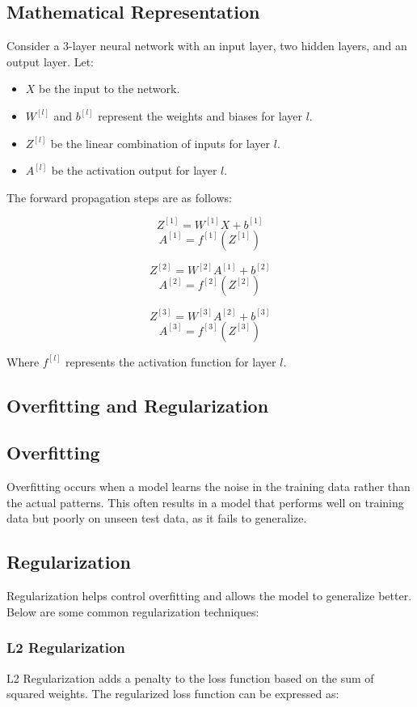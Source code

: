\documentclass{article}
\begin{document}
\subsection*{Mathematical Representation}
Consider a 3-layer neural network with an input layer, two hidden layers, and an output layer. Let:
\begin{itemize}
    \item \( X \) be the input to the network.
    \item \( W^{[l]} \) and \( b^{[l]} \) represent the weights and biases for layer \( l \).
    \item \( Z^{[l]} \) be the linear combination of inputs for layer \( l \).
    \item \( A^{[l]} \) be the activation output for layer \( l \).
\end{itemize}

The forward propagation steps are as follows:

\[
Z^{[1]} = W^{[1]} X + b^{[1]}
\]
\[
A^{[1]} = f^{[1]}(Z^{[1]})
\]

\[
Z^{[2]} = W^{[2]} A^{[1]} + b^{[2]}
\]
\[
A^{[2]} = f^{[2]}(Z^{[2]})
\]

\[
Z^{[3]} = W^{[3]} A^{[2]} + b^{[3]}
\]
\[
A^{[3]} = f^{[3]}(Z^{[3]})
\]

Where \( f^{[l]} \) represents the activation function for layer \( l \).

\subsection{Overfitting and Regularization}

\subsection*{Overfitting}
Overfitting occurs when a model learns the noise in the training data rather than the actual patterns. This often results in a model that performs well on training data but poorly on unseen test data, as it fails to generalize.

\subsection*{Regularization}
Regularization helps control overfitting and allows the model to generalize better. Below are some common regularization techniques:

\subsubsection*{L2 Regularization}
L2 Regularization adds a penalty to the loss function based on the sum of squared weights. The regularized loss function can be expressed as:
\end{document}
